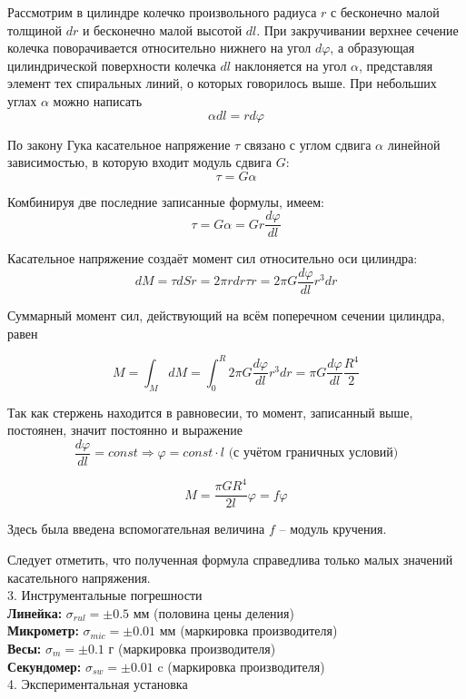 \documentclass[12pt, a4paper]{article}
\begin{document}
Рассмотрим в цилиндре колечко произвольного радиуса $r$ с бесконечно малой толщиной $dr$ и бесконечно малой высотой $dl$. При закручивании верхнее сечение колечка поворачивается относительно нижнего на угол $d\varphi$, а образующая цилиндрической поверхности колечка $dl$ наклоняется на угол $\alpha$, представляя элемент тех спиральных линий, о которых говорилось выше. При небольших углах $\alpha$ можно написать
\[\alpha dl = r d\varphi\]

По закону Гука касательное напряжение $\tau$ связано с углом сдвига $\alpha$ линейной зависимостью, в которую входит модуль сдвига $G$:
\[\tau = G \alpha\]

Комбинируя две последние записанные формулы, имеем:
\[\tau = G \alpha = G r \frac{d\varphi}{d l}\]

Касательное напряжение создаёт момент сил относительно оси цилиндра:
\[dM = \tau dS  r = 2 \pi r dr \tau r = 2 \pi G \frac{d\varphi}{d l} r^3 dr\]

Суммарный момент сил, действующий на всём поперечном сечении цилиндра, равен

\[M = \int_M dM = \int_0^{R}2 \pi G \frac{d\varphi}{d l} r^3 dr = \pi G \frac{d\varphi}{d l} \frac{R^4}{2}\]

Так как стержень находится в равновесии, то момент, записанный выше, постоянен, значит постоянно и выражение
\[\frac{d\varphi}{d l} = const \Rightarrow \varphi = const \cdot l \text{ (с учётом граничных условий)}\]

\[M = \frac{\pi G R^4}{2l} \varphi = f \varphi\]

Здесь была введена вспомогательная величина $f$ -- модуль кручения. 

Следует отметить, что полученная формула справедлива только малых значений касательного напряжения.\\


\vspace{1cm}
{\Large 3. Инструментальные погрешности \\}
\noindent
\textbf{Линейка: } $\sigma_{rul} = \pm 0.5$ мм (половина цены деления)\\
\textbf{Микрометр: } $\sigma_{mic} = \pm 0.01$ мм (маркировка производителя) \\
\textbf{Весы: } $\sigma_{m} = \pm 0.1$ г (маркировка производителя) \\
\textbf{Секундомер: } $\sigma_{sw} = \pm 0.01$ c (маркировка производителя) \\


{\Large 4. Экспериментальная установка \\}
\end{document}
